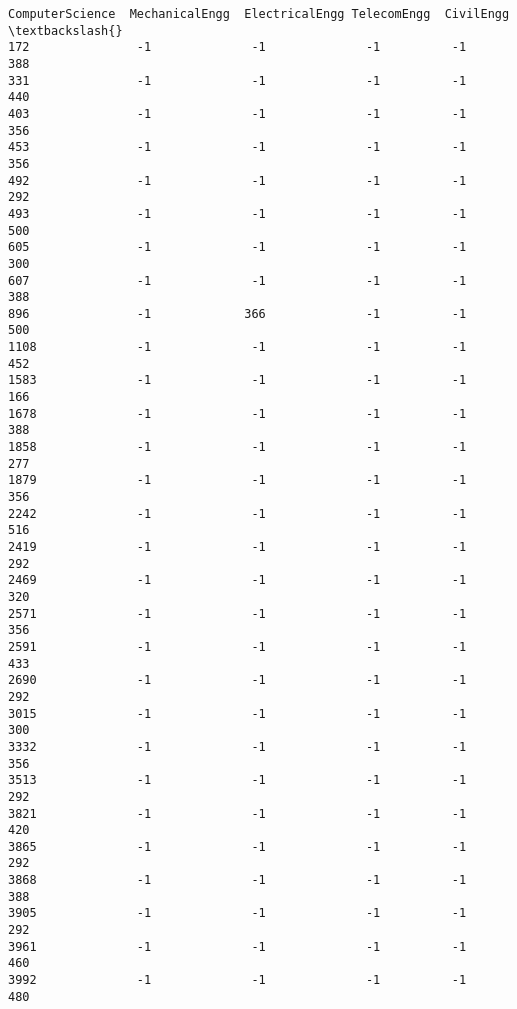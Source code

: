 \documentclass[11pt]{article}
\begin{document}
\begin{tcolorbox}[breakable, size=fbox, boxrule=.5pt, pad at break*=1mm, opacityfill=0]
\begin{Verbatim}[commandchars=\\\{\}]
     ComputerScience  MechanicalEngg  ElectricalEngg TelecomEngg  CivilEngg  \textbackslash{}
172               -1              -1              -1          -1        388
331               -1              -1              -1          -1        440
403               -1              -1              -1          -1        356
453               -1              -1              -1          -1        356
492               -1              -1              -1          -1        292
493               -1              -1              -1          -1        500
605               -1              -1              -1          -1        300
607               -1              -1              -1          -1        388
896               -1             366              -1          -1        500
1108              -1              -1              -1          -1        452
1583              -1              -1              -1          -1        166
1678              -1              -1              -1          -1        388
1858              -1              -1              -1          -1        277
1879              -1              -1              -1          -1        356
2242              -1              -1              -1          -1        516
2419              -1              -1              -1          -1        292
2469              -1              -1              -1          -1        320
2571              -1              -1              -1          -1        356
2591              -1              -1              -1          -1        433
2690              -1              -1              -1          -1        292
3015              -1              -1              -1          -1        300
3332              -1              -1              -1          -1        356
3513              -1              -1              -1          -1        292
3821              -1              -1              -1          -1        420
3865              -1              -1              -1          -1        292
3868              -1              -1              -1          -1        388
3905              -1              -1              -1          -1        292
3961              -1              -1              -1          -1        460
3992              -1              -1              -1          -1        480


\end{Verbatim}
\end{tcolorbox}
\end{document}

